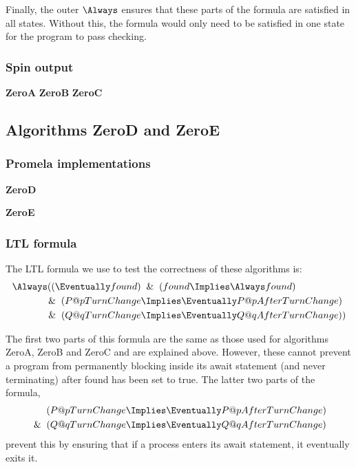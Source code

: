 \documentclass[12pt,a4paper]{scrartcl}
\begin{document}
Finally, the outer \(\Always\) ensures that these parts of the formula are satisfied in all states. Without this, the formula would only need to be satisfied in one state for the program to pass checking.

\subsubsection{Spin output}
\textbf{ZeroA}
\textbf{ZeroB}
\textbf{ZeroC}

\subsection{Algorithms ZeroD and ZeroE}

\subsubsection{Promela implementations}

\textbf{ZeroD}

\textbf{ZeroE}


\subsubsection{LTL formula}

The LTL formula we use to test the correctness of these algorithms is:
\begin{align} 
\Always ( ( \Eventually found ) &\And ( found \Implies \Always found )\notag\\
\And ( P@pTurnChange &\Implies \Eventually P@pAfterTurnChange )\\
\And ( Q@qTurnChange &\Implies \Eventually Q@qAfterTurnChange ) )\notag
\end{align}

The first two parts of this formula are the same as those used for algorithms ZeroA, ZeroB and ZeroC and are explained above. However, these cannot prevent a program from permanently blocking inside its await statement (and never terminating) after found has been set to true. The latter two parts of the formula,
\begin{align} 
( P@pTurnChange &\Implies \Eventually P@pAfterTurnChange )\notag\\
\And ( Q@qTurnChange &\Implies \Eventually Q@qAfterTurnChange ) 
\end{align}
prevent this by ensuring that if a process enters its await statement, it eventually exits it.
\end{document}
